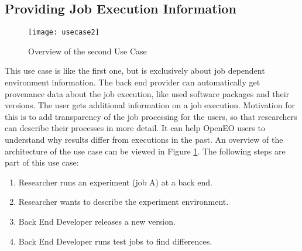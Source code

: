 \documentclass[draft,final]{vutinfth} %
\begin{document}
\subsection{Providing Job Execution Information}\label{UseCase2}
\begin{figure}[h]
	\centering
	\texttt{[image: usecase2]}
	\caption{Overview of the second Use Case}
	\label{fig:usecase2} %
\end{figure}
This use case is like the first one, but is exclusively about job dependent environment information. The back end provider can automatically get provenance data about the job execution, like used software packages and their versions. The user gets additional information on a job execution. Motivation for this is to add transparency of the job processing for the users, so that researchers can describe their processes in more detail. It can help OpenEO users to understand why results differ from executions in the past. An overview of the architecture of the use case can be viewed in Figure \ref{fig:usecase2}. 
The following steps are part of this use case:
\begin{enumerate}
	\item Researcher runs an experiment (job A) at a back end.
	\item Researcher wants to describe the experiment environment.
	\item Back End Developer releases a new version.   
	\item Back End Developer runs test jobs to find differences.
\end{enumerate}
\end{document}
